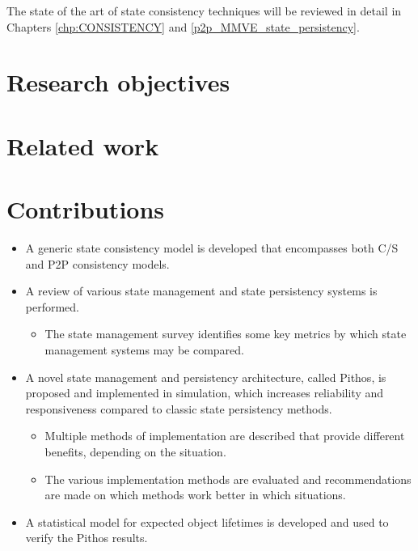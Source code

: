 The state of the art of state consistency techniques will be reviewed in detail in Chapters \ref{chp:CONSISTENCY} and \ref{p2p_MMVE_state_persistency}.

\section{Research objectives}

\section{Related work}

\section{Contributions}
\label{objectives}

\begin{itemize}
\item A generic state consistency model is developed that encompasses both C/S and P2P consistency models.

\item A review of various state management and state persistency systems is performed.
    \begin{itemize}
    \item The state management survey identifies some key metrics by which state management systems may be compared.
    \end{itemize}

\item A novel state management and persistency architecture, called Pithos, is proposed and implemented in simulation, which increases reliability and responsiveness compared to classic state persistency methods.
    \begin{itemize}
    \item Multiple methods of implementation are described that provide different benefits, depending on the situation.
    \item The various implementation methods are evaluated and recommendations are made on which methods work better in which situations.
    \end{itemize}

\item A statistical model for expected object lifetimes is developed and used to verify the Pithos results.
\end{itemize}

